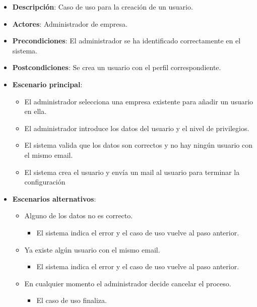 \documentclass[12pt,a4paperpaper,]{report}
\providecommand{\tightlist}{%
  \setlength{\itemsep}{0pt}\setlength{\parskip}{0pt}}
\begin{document}
\begin{itemize}
\tightlist
\item
  \textbf{Descripción}: Caso de uso para la creación de un usuario.
\item
  \textbf{Actores}: Administrador de empresa.
\item
  \textbf{Precondiciones}: El administrador se ha identificado
  correctamente en el sistema.
\item
  \textbf{Postcondiciones}: Se crea un usuario con el perfil
  correspondiente.
\item
  \textbf{Escenario principal}:

  \begin{itemize}
  \tightlist
  \item
    El administrador selecciona una empresa existente para añadir un
    usuario en ella.
  \item
    El administrador introduce los datos del usuario y el nivel de
    privilegios.
  \item
    El sistema valida que los datos son correctos y no hay ningún
    usuario con el mismo email.
  \item
    El sistema crea el usuario y envía un mail al usuario para terminar
    la configuración
  \end{itemize}
\item
  \textbf{Escenarios alternativos}:

  \begin{itemize}
  \tightlist
  \item
    Alguno de los datos no es correcto.

    \begin{itemize}
    \tightlist
    \item
      El sistema indica el error y el caso de uso vuelve al paso
      anterior.
    \end{itemize}
  \item
    Ya existe algún usuario con el mismo email.

    \begin{itemize}
    \tightlist
    \item
      El sistema indica el error y el caso de uso vuelve al paso
      anterior.
    \end{itemize}
  \item
    En cualquier momento el administrador decide cancelar el proceso.

    \begin{itemize}
    \tightlist
    \item
      El caso de uso finaliza.
    \end{itemize}
  \end{itemize}
\end{itemize}
\end{document}
